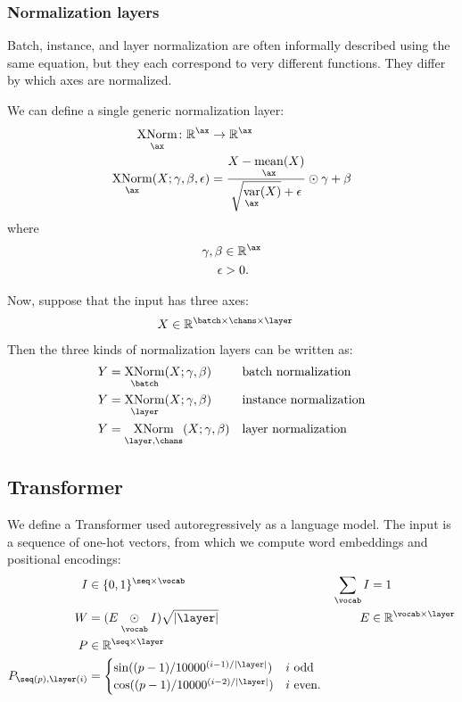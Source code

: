 \documentclass{article}
\newcommand{\reals}{\mathbb{R}}
\begin{document}
\subsubsection{Normalization layers}

Batch, instance, and layer normalization are often informally described using the same
equation, but they each correspond to very different functions. They differ
by which axes are normalized.

We can define a single generic normalization layer:
\begin{align*}
  \nfun{\ax}{XNorm} \colon \mathbb{R}^{\ax} &\rightarrow \mathbb{R}^{\ax} \\
  \nfun{\ax}{XNorm}(X; \gamma, \beta, \epsilon) &= \frac{X - \nfun{\ax}{mean}(X)}{\sqrt{\nfun{\ax}{var}(X)} + \epsilon} \odot \gamma + \beta
\end{align*}
where
\begin{align*}
  \gamma, \beta &\in \mathbb{R}^{\ax} \\
  \epsilon &> 0.
\end{align*}

Now, suppose that the input has three axes:
\begin{align*}
X &\in \reals^{{\batch \times \chans \times \layer}}
\end{align*}
Then the three kinds of normalization layers can be written as:
\begin{align*}
Y &= \nfun{\batch}{XNorm}(X; \gamma, \beta) && \text{batch normalization} \\
Y &= \nfun{\layer}{XNorm}(X; \gamma, \beta) && \text{instance normalization} \\
Y &= \nfun{\layer,\chans}{XNorm}(X; \gamma, \beta) && \text{layer normalization}
\end{align*}

\subsection{Transformer}
\label{sec:transformer}

We define a Transformer used autoregressively as a language model.
The input is a sequence of one-hot vectors, from which we compute word embeddings and positional encodings:
\begin{align*}
  I &\in \{0, 1\}^{\seq \times \vocab} & \nsum{\vocab} I &= 1 \\
  W &= (E \ndot{\vocab} I)\sqrt{|\layer|} & E &\in \reals^{\vocab \times \layer} \\
  P &\in \reals^{\seq \times \layer} \\
  P_{\seq(p), \layer(i)} &= \begin{cases}
    \sin((p-1) / 10000^{(i-1) / |\layer|}) & \text{$i$ odd} \\ 
    \cos((p-1) / 10000^{(i-2) / |\layer|}) & \text{$i$ even.}
  \end{cases}
\end{align*}
\end{document}

